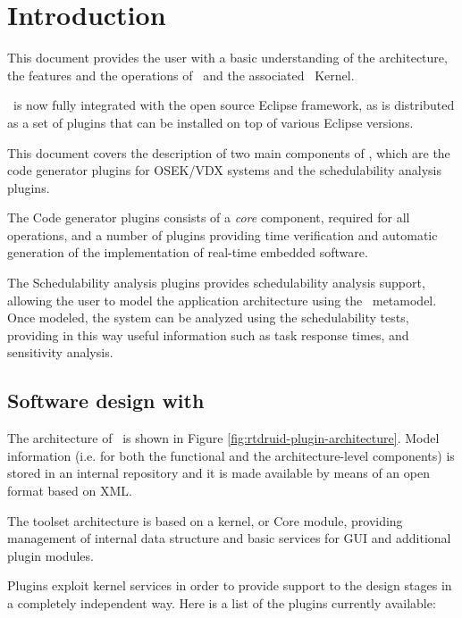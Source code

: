 
\chapter{Introduction}
\label{cha:intro}

This document provides the user with a basic understanding of the
architecture, the features and the operations of \rtd\ and the
associated \ee\ Kernel.

\rtd\ is now fully integrated with the open source Eclipse framework,
as is distributed as a set of plugins that can be installed on top of
various Eclipse versions.

This document covers the description of two main components of \rtd,
which are the code generator plugins for OSEK/VDX systems and the
schedulability analysis plugins.

The Code generator plugins consists of a {\em core} component,
required for all operations, and a number of plugins providing time
verification and automatic generation of the implementation of
real-time embedded software.

The Schedulability analysis plugins provides schedulability analysis
support, allowing the user to model the application architecture using
the \rtd\ metamodel. Once modeled, the system can be analyzed using
the schedulability tests, providing in this way useful information
such as task response times, and sensitivity analysis.


\section{Software design with \rtd{}}

The architecture of \rtd\ is shown in Figure
\ref{fig:rtdruid-plugin-architecture}. Model information (i.e. for
both the functional and the architecture-level components) is stored
in an internal repository and it is made available by means of an open
format based on XML.

The toolset architecture is based on a kernel, or Core module, providing
management of internal data structure and basic services for GUI and
additional plugin modules.

Plugins exploit kernel services in order to provide support to the
design stages in a completely independent way. Here is a list of the
plugins currently available:

